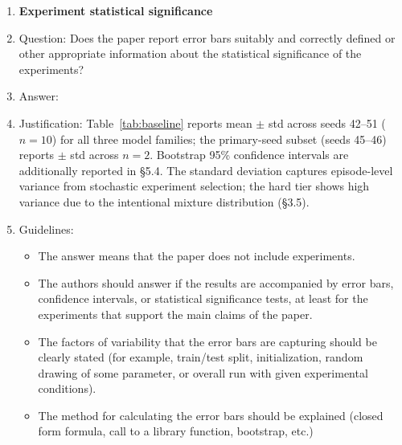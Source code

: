 \begin{enumerate}
\item {\bf Experiment statistical significance}
    \item[] Question: Does the paper report error bars suitably and correctly defined or other appropriate information about the statistical significance of the experiments?
    \item[] Answer: \answerYes{}
    \item[] Justification: Table~\ref{tab:baseline} reports mean $\pm$ std
    across seeds 42--51 ($n{=}10$) for all three model families; the primary-seed
    subset (seeds 45--46) reports $\pm$ std across $n{=}2$.  Bootstrap 95\%
    confidence intervals are additionally reported in \S5.4.  The standard
    deviation captures episode-level variance from stochastic experiment selection;
    the hard tier shows high variance due to the intentional mixture
    distribution (\S3.5).
    \item[] Guidelines: \begin{itemize}
        \item The answer \answerNA{} means that the paper does not include experiments.
        \item The authors should answer \answerYes{} if the results are accompanied by error bars, confidence intervals, or statistical significance tests, at least for the experiments that support the main claims of the paper.
        \item The factors of variability that the error bars are capturing should be clearly stated (for example, train/test split, initialization, random drawing of some parameter, or overall run with given experimental conditions).
        \item The method for calculating the error bars should be explained (closed form formula, call to a library function, bootstrap, etc.)
    \end{itemize}


\end{enumerate}
